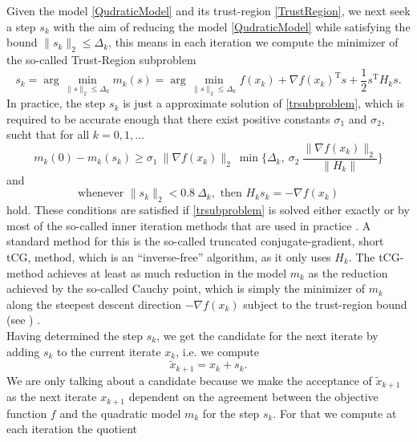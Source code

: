 Given the model \cref{QudraticModel} and its trust-region \cref{TrustRegion}, we next seek a step $s_k$ with the aim of reducing the model \cref{QudraticModel} while satisfying the bound $\lVert s_k \rVert_2 \leq \Delta_k$, this means in each iteration we compute the minimizer of the so-called Trust-Region subproblem
\begin{equation}\label{trsubproblem}
    s_k = \arg \min_{\lVert s \rVert_2 \leq \Delta_k} m_k(s) = \arg \min_{\lVert s \rVert_2 \leq \Delta_k} f(x_k) + \nabla f(x_k)^{\mathrm{T}} s + \frac{1}{2} s^{\mathrm{T}} H_k s.
\end{equation}
In practice, the step $s_k$ is just a approximate solution of \cref{trsubproblem}, which is required to be accurate enough that there exist positive constants $\sigma_1$ and $\sigma_2$, sucht that for all $k = 0, 1, \ldots$
\begin{equation}\label{accuracy1}
    m_k(0) - m_k(s_k) \geq \sigma_1 \ \lVert \nabla f(x_k) \rVert_2 \ \min \Bigg \{ \Delta_k, \ \sigma_2 \ \frac{\lVert \nabla f(x_k) \rVert_2}{\lVert H_k \rVert} \Bigg \} 
\end{equation} 
and
\begin{equation}\label{accuracy2}
    \text{whenever } \lVert s_k \rVert_2 < 0.8 \ \Delta_k, \text{ then } H_k s_k = - \nabla f(x_k)
\end{equation}
hold. These conditions are satisfied if \cref{trsubproblem} is solved either exactly or by most of the so-called inner iteration methods that are used in practice \cite[p.~1027]{ByrdKhalfanSchnabel:1996}. A standard method for this is the so-called truncated conjugate-gradient, short tCG, method, which is an “inverse-free” algorithm, as it only uses $H_k$. The tCG-method achieves at least as much reduction in the model $m_k$ as the reduction achieved by the so-called Cauchy point, which is simply the minimizer of $m_k$ along the steepest descent direction $- \nabla f(x_k)$ subject to the trust-region bound (see \cite[4.1~Algorithms~based~on~the~cauchy~point]{NocedalWright:2006}) \cite[p.~71]{NocedalWright:2006}. \\
Having determined the step $s_k$, we get the candidate for the next iterate by adding $s_k$ to the current iterate $x_k$, i.e. we compute 
\begin{equation}\label{candidate}
    \widetilde{x}_{k+1} = x_k + s_k.
\end{equation}
We are only talking about a candidate because we make the acceptance of $\widetilde{x}_{k+1}$ as the next iterate $x_{k+1}$ dependent on the agreement between the objective function $f$ and the quadratic model $m_k$ for the step $s_k$. For that we compute at each iteration the quotient
